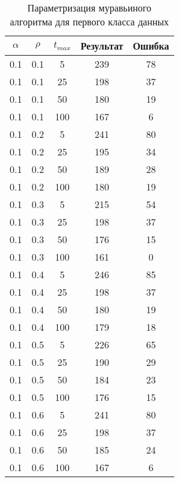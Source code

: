 \begin{appendices}
	\chapter{}
	\label{tabel_mt1}
	\begin{center}
	\begin{longtable}[c]{|c|c|c|c|c|}
	
	\caption[c]{Параметризация муравьиного алгоритма для первого класса данных} \\
		\hline
			$\alpha$ & $ \rho $ & $t_{max}$ & Результат & Ошибка \\
		\hline
		\endhead
		
		\hline
		\endfoot
		
		0.1& 0.1& 5& 239&  78\\
		\hline
		0.1& 0.1& 25& 198&  37\\
		\hline
		0.1& 0.1& 50& 180&  19\\
		\hline
		0.1& 0.1& 100& 167&  6\\
		\hline
		0.1& 0.2& 5& 241&  80\\
		\hline
		0.1& 0.2& 25& 195&  34\\
		\hline
		0.1& 0.2& 50& 189&  28\\
		\hline
		0.1& 0.2& 100& 180&  19\\
		\hline
		0.1& 0.3& 5& 215&  54\\
		\hline
		0.1& 0.3& 25& 198&  37\\
		\hline
		0.1& 0.3& 50& 176&  15\\
		\hline
		0.1& 0.3& 100& 161& 0\\
		\hline
		0.1& 0.4& 5& 246&  85\\
		\hline
		0.1& 0.4& 25& 198&  37\\
		\hline
		0.1& 0.4& 50& 180&  19\\
		\hline
		0.1& 0.4& 100& 179&  18\\
		\hline
		0.1& 0.5& 5& 226&  65\\
		\hline
		0.1& 0.5& 25& 190&  29\\
		\hline
		0.1& 0.5& 50& 184&  23\\
		\hline
		0.1& 0.5& 100& 176&  15\\
		\hline
		0.1& 0.6& 5& 241&  80\\
		\hline
		0.1& 0.6& 25& 198&  37\\
		\hline
		0.1& 0.6& 50& 185&  24\\
		\hline
		0.1& 0.6& 100& 167&  6\\

\end{longtable}
\end{center}
\end{appendices}
